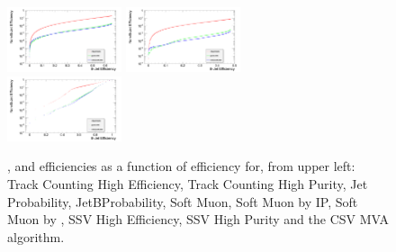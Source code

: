 \begin{figure}[hbtp]
     \includegraphics[width=0.3\textwidth]{Chapters/06_BTag_Study/Images/SimpleSecondaryVertexHighEfficiency_nonBJetEfficiency_v_bJetEfficiency}\hfill
     \includegraphics[width=0.3\textwidth]{Chapters/06_BTag_Study/Images/SimpleSecondaryVertexHighPurity_nonBJetEfficiency_v_bJetEfficiency}\\
     \includegraphics[width=0.3\textwidth]{Chapters/06_BTag_Study/Images/CombinedSecondaryVertexMVA_nonBJetEfficiency_v_bJetEfficiency}\\
     \caption[\cjet, \gjet and \udsjet efficiencies as a function of \bjet efficiency for CMS
     \btagging algorithms.]{\cjet, \gjet and \udsjet efficiencies as a function of \bjet efficiency for, from
     upper left: Track Counting High Efficiency, Track Counting High Purity, Jet Probability, JetBProbability,
     Soft Muon, Soft Muon by IP, Soft Muon by \pt, SSV High Efficiency, SSV High Purity and the CSV MVA
     algorithm.}
     \label{fig:all_algorithm_efficiencies}
\end{figure}
